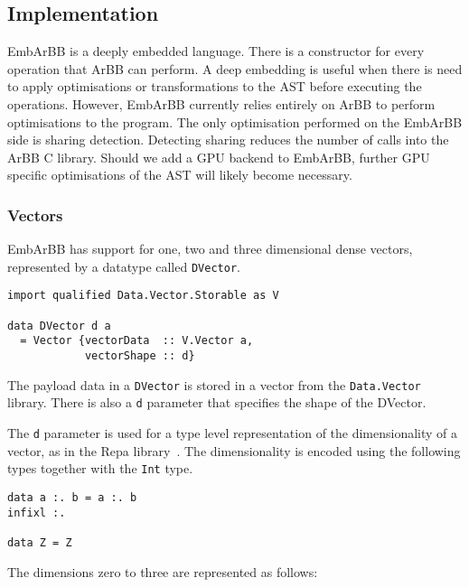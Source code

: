 

\subsection{Implementation} 
EmbArBB is a deeply embedded language. There is a constructor for 
every operation that ArBB can perform. A deep embedding is useful when 
there is need to apply optimisations or transformations to the AST before 
executing the operations. However, EmbArBB currently relies entirely on 
ArBB to perform optimisations to the program. The only optimisation 
performed on the EmbArBB side is sharing detection. Detecting sharing 
reduces the number of calls into the ArBB C library. Should we add a 
GPU backend to EmbArBB, further GPU specific optimisations of the AST 
will likely become necessary. 
 

\subsubsection{Vectors} 
EmbArBB has support for one, two and three dimensional dense vectors,
represented by a datatype called {\tt DVector}. 

\begin{verbatim}
import qualified Data.Vector.Storable as V

data DVector d a 
  = Vector {vectorData  :: V.Vector a, 
            vectorShape :: d} 
\end{verbatim}  

The payload data in a {\tt DVector} is stored in a vector from the 
{\tt Data.Vector} library. There is also a {\tt d} parameter that specifies 
the shape of the DVector. 


The {\tt d} parameter is used for a type level representation of the 
dimensionality of a vector, as in the Repa library~\cite{REPA}. The 
dimensionality is encoded using the following types together with 
the {\tt Int} type. 

\begin{verbatim} 
data a :. b = a :. b  
infixl :. 

data Z = Z 
\end{verbatim} 

The dimensions zero to three are represented as follows:

